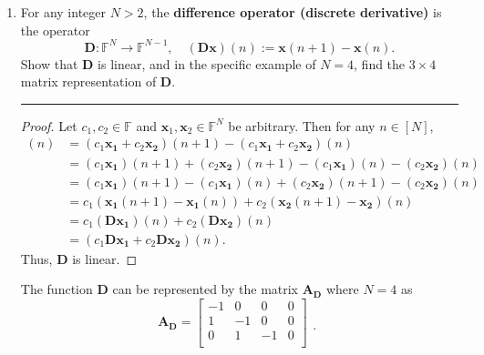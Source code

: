\documentclass[12pt]{amsart}
\newcommand{\1}{\mathbbm{1}}
\numberwithin{equation}{section}
\numberwithin{Theorem}{section}
\theoremstyle{plain} %
\theoremstyle{definition}
\theoremstyle{remark}
\begin{document}
\thispagestyle{empty}

\bigskip


\begin{enumerate}[1.]



\item
For any integer $N>2$, the \textbf{difference operator (discrete derivative)} is the operator
\begin{equation*}
\mathbf{D}:\mathbb{F}^{N}\rightarrow\mathbb{F}^{N-1},\quad(\mathbf{D}\mathbf{x})(n):=\mathbf{x}(n+1)-\mathbf{x}(n).
\end{equation*}
Show that $\mathbf{D}$ is linear, and in the specific example of $N=4$, find the $3\times 4$ matrix representation of $\mathbf{D}$.

\bigskip
\hrule
\bigskip

\begin{proof}
	Let \(c_1,c_2 \in \mathbb{F}\) and \( \mathbf{x}_1, \mathbf{x}_2 \in \mathbb{F}^N \) be arbitrary.
	Then for any \(n\in [N]\),
	\begin{align*}
		[\mathbf{D}(c_1\mathbf{x_1} + c_2\mathbf{x_2})](n)
		&= (c_1\mathbf{x_1} + c_2\mathbf{x_2})(n+1) - (c_1\mathbf{x_1} + c_2\mathbf{x_2})(n) \\
		&= (c_1\mathbf{x_1})(n+1) + (c_2\mathbf{x_2})(n+1) - (c_1\mathbf{x_1})(n) - (c_2\mathbf{x_2})(n) \\
		&= (c_1\mathbf{x_1})(n+1) - (c_1\mathbf{x_1})(n) + (c_2\mathbf{x_2})(n+1) - (c_2\mathbf{x_2})(n) \\
		&= c_1(\mathbf{x_1}(n+1) - \mathbf{x_1}(n)) + c_2(\mathbf{x_2}(n+1) - \mathbf{x_2})(n) \\
		&= c_1(\mathbf{D}\mathbf{x_1})(n) + c_2(\mathbf{D}\mathbf{x_2})(n) \\
		&= (c_1\mathbf{D}\mathbf{x_1} + c_2\mathbf{D}\mathbf{x_2})(n).
	\end{align*}
	Thus, $\mathbf{D}$ is linear.
\end{proof}
The function \(\mathbf{D}\) can be represented by the matrix \(\mathbf{A_D}\) where \(N=4\) as
\[
\mathbf{A_D} = \begin{bmatrix}
	-1 & 0 & 0 & 0 \\
	1 & -1 & 0 & 0 \\
	0 & 1 & -1 & 0 \\
\end{bmatrix}
\begin{matrix}
	\\ \\ \\ .\\
\end{matrix}
\]


\end{enumerate}
\end{document}
